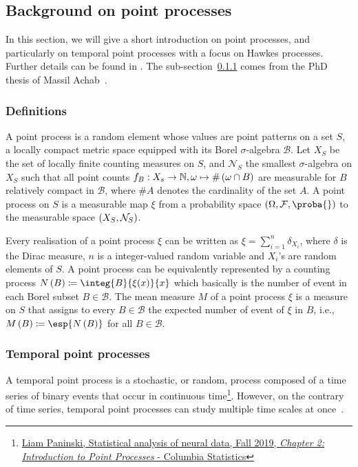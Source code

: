 \subsection{Background on point processes}\label{background_tpp}

In this section, we will give a short introduction on point processes, and particularly on temporal point processes with a focus on Hawkes processes.
Further details can be found in \citep{daley2003introduction, daley2007introduction}.
The sub-section~\ref{pp_definitions} comes from the PhD thesis of Massil Achab~\citep{achab2017learning}.

\subsubsection{Definitions}\label{pp_definitions}
A point process is a random element whose values are point patterns on a set $S$, a locally compact metric space equipped with its Borel $\sigma$-algebra $\mathscr{B}$.
Let $X_S$ be the set of locally finite counting measures on $S$, and $\mathcal{N}_S$ the smallest $\sigma$-algebra on $X_S$ such that all point counts ${f_B: X_s \to \mathbb{N}, \omega \mapsto \#\left( \omega \cap B \right)}$ are measurable for $B$ relatively compact in $\mathscr{B}$, where $\# A$ denotes the cardinality of the set $A$.
A point process on $S$ is a measurable map $\xi$ from a probability space $\pars{\Omega, \mathcal{F}, \proba{}}$ to the measurable space $\left( X_S, \mathcal{N}_S \right)$.

Every realisation of a point process $\xi$ can be written as $\xi = \sum_{i=1}^n \delta_{X_i}$, where $\delta$ is the Dirac measure, $n$ is a integer-valued random variable and $X_i$'s are random elements of $S$.
A point process can be equivalently represented by a counting process $N\pars{B} \coloneqq \integ{B}{\xi (x)}{x}$ which basically is the number of event in each Borel subset $B\in\mathscr{B}$.
The mean measure $M$ of a point process $\xi$ is a measure on $S$ that assigns to every $B\in\mathscr{B}$ the expected number of event of $\xi$ in $B$, i.e., $M\pars{B} \coloneqq \esp{N\pars{B}}$ for all $B\in\mathscr{B}$.


\subsubsection{Temporal point processes}
A temporal point process is a stochastic, or random, process composed of a time series of binary events that occur in continuous time\footnote{\href{http://www.stat.columbia.edu/~liam/teaching/neurostat-fall19/uri-eden-point-process-notes.pdf}{Liam Paninski, Statistical analysis of neural data, Fall 2019, \textit{Chapter 2: Introduction to Point Processes} - Columbia Statistics}}.
However, on the contrary of time series, temporal point processes can study multiple time scales at once~\citep{bompaire2019machine}. 

